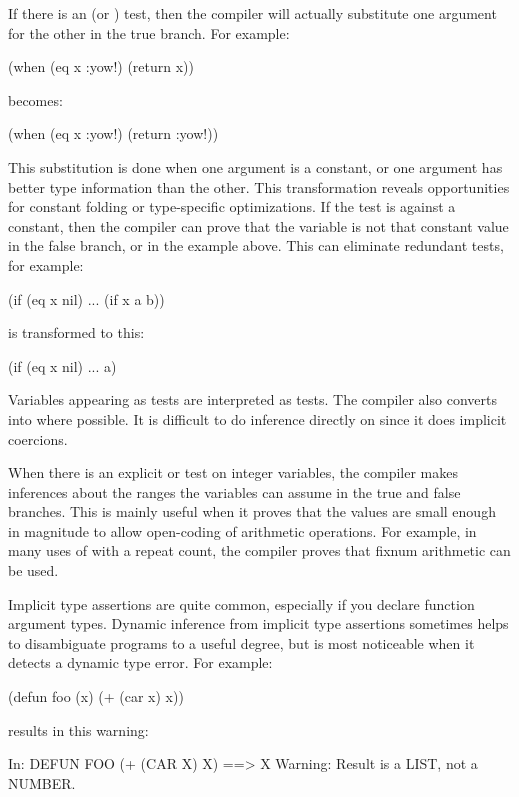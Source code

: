 {If there is an  (or ) test, then the compiler will actually
substitute one argument for the other in the true branch.  For example:
\begin{lisp}
(when (eq x :yow!) (return x))
\end{lisp}
becomes:
\begin{lisp}
(when (eq x :yow!) (return :yow!))
\end{lisp}
This substitution is done when one argument is a constant, or one argument has
better type information than the other.  This transformation reveals
opportunities for constant folding or type-specific optimizations.  If the test
is against a constant, then the compiler can prove that the variable is not
that constant value in the false branch, or 
in the example above.  This can eliminate redundant tests, for example:
\begin{example}
(if (eq x nil)
    ...
    (if x a b))
\end{example}
is transformed to this:
\begin{example}
(if (eq x nil)
    ...
    a)
\end{example}
Variables appearing as  tests are interpreted as 
 tests.  The compiler also converts \code{=} into
 where possible.  It is difficult to do inference directly on \code{=}
since it does implicit coercions.

When there is an explicit \code{<} or \code{>} test on integer variables, the
compiler makes inferences about the ranges the variables can assume in the true
and false branches.  This is mainly useful when it proves that the values are
small enough in magnitude to allow open-coding of arithmetic operations.  For
example, in many uses of  with a  repeat count, the
compiler proves that fixnum arithmetic can be used.

Implicit type assertions are quite common, especially if you declare function
argument types.  Dynamic inference from implicit type assertions sometimes
helps to disambiguate programs to a useful degree, but is most noticeable when
it detects a dynamic type error.  For example:
\begin{lisp}
(defun foo (x)
  (+ (car x) x))
\end{lisp} 
results in this warning:
\begin{example}
In: DEFUN FOO
  (+ (CAR X) X)
==>
  X
Warning: Result is a LIST, not a NUMBER.
\end{example}

}
